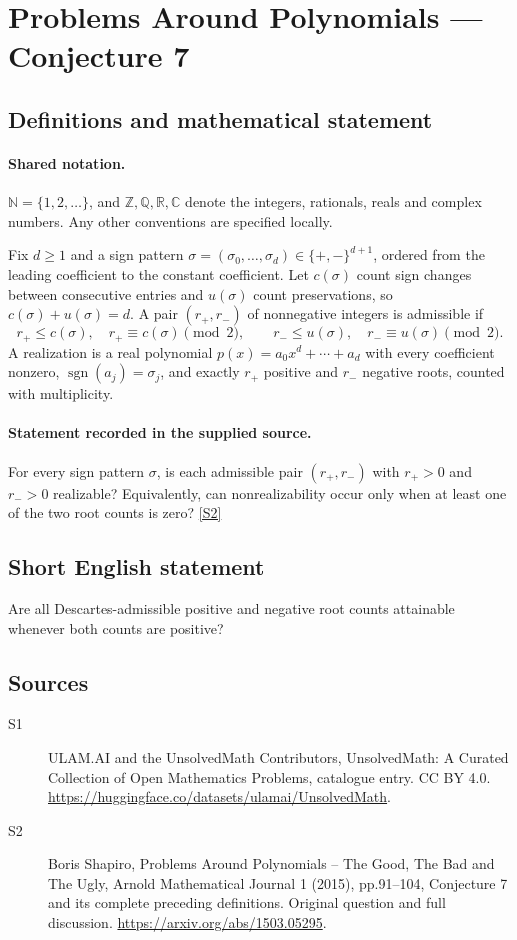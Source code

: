 \documentclass[11pt]{article}
\newcommand{\sref}[2]{\hyperlink{source:#1:#2}{[S#2]}}
\begin{document}
\section{Problems Around Polynomials — Conjecture 7}\label{statement}

\subsection{Definitions and mathematical statement}

\paragraph{Shared notation.}$\mathbb N=\{1,2,\ldots\}$, and $\mathbb Z,\mathbb Q,\mathbb R,\mathbb C$ denote the integers, rationals, reals and complex numbers. Any other conventions are specified locally.


Fix $d\geq1$ and a sign pattern $\sigma=(\sigma_0,\ldots,\sigma_d)\in\{+,-\}^{d+1}$, ordered from the leading coefficient to the constant coefficient. Let $c(\sigma)$ count sign changes between consecutive entries and $u(\sigma)$ count preservations, so $c(\sigma)+u(\sigma)=d$. A pair $(r_+,r_-)$ of nonnegative integers is admissible if
\[r_+\leq c(\sigma),\quad r_+\equiv c(\sigma)\pmod2,\qquad r_-\leq u(\sigma),\quad r_-\equiv u(\sigma)\pmod2.\]
A realization is a real polynomial $p(x)=a_0x^d+\cdots+a_d$ with every coefficient nonzero, $\operatorname{sgn}(a_j)=\sigma_j$, and exactly $r_+$ positive and $r_-$ negative roots, counted with multiplicity.
\paragraph{Statement recorded in the supplied source.}
For every sign pattern $\sigma$, is each admissible pair $(r_+,r_-)$ with $r_+>0$ and $r_->0$ realizable? Equivalently, can nonrealizability occur only when at least one of the two root counts is zero? \sref{statement}{2}
\subsection{Short English statement}
Are all Descartes-admissible positive and negative root counts attainable whenever both counts are positive?
\subsection{Sources}
\begin{description}
\item[\hypertarget{source:statement:1}{S1}] ULAM.AI and the UnsolvedMath Contributors, UnsolvedMath: A Curated Collection of Open Mathematics Problems, catalogue entry. CC BY 4.0. \url{https://huggingface.co/datasets/ulamai/UnsolvedMath}.
\item[\hypertarget{source:statement:2}{S2}] Boris Shapiro, Problems Around Polynomials -- The Good, The Bad and The Ugly, Arnold Mathematical Journal 1 (2015), pp.91--104, Conjecture 7 and its complete preceding definitions. Original question and full discussion. \url{https://arxiv.org/abs/1503.05295}.

\end{description}
\label{end:statement}
\end{document}
